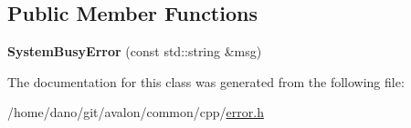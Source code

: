 \subsection*{Public Member Functions}
\begin{DoxyCompactItemize}
\item 
\mbox{\label{classtcf_1_1error_1_1SystemBusyError_a7ff4b07fc9c01aaaedf75d8f7a704c8e}} 
{\bfseries System\+Busy\+Error} (const std\+::string \&msg)
\end{DoxyCompactItemize}


The documentation for this class was generated from the following file\+:\begin{DoxyCompactItemize}
\item 
/home/dano/git/avalon/common/cpp/\hyperlink{error_8h}{error.\+h}\end{DoxyCompactItemize}
